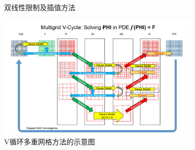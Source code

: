 \documentclass[10pt,aspectratio=169]{beamer} %
\begin{document}
\begin{frame}
    \begin{figure}
        \quad
        \quad
        \caption{双线性限制及插值方法}
    \end{figure}
\end{frame}

\begin{frame}
    \begin{figure}
        \includegraphics[height=6cm]{images/Multigrid_Visualization.png}
        \caption{V循环多重网格方法的示意图}
    \end{figure}
\end{frame}
\end{document}
